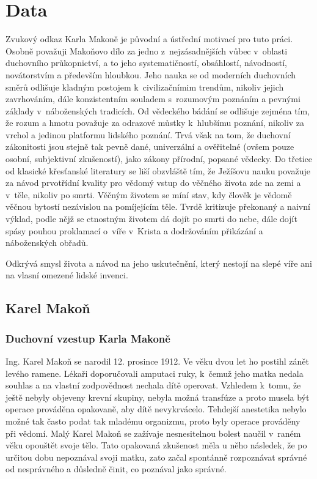 \chapter{Data}
\label{kap:data}

Zvukový odkaz Karla Makoně je původní a ústřední motivací pro tuto práci. Osobně
považuji Makoňovo dílo za jedno z~nejzásadnějších vůbec v~oblasti duchovního
průkopnictví, a to jeho systematičností, obsáhlostí, návodností, novátorstvím a
především hloubkou. Jeho nauka se od moderních duchovních směrů odlišuje kladným
postojem k~civilizačnímim trendům, nikoliv jejich zavrhováním, dále
konzistentním souladem s~rozumovým poznáním a pevnými základy v~náboženských
tradicích. Od vědeckého bádání se odlišuje zejména tím, že rozum a hmotu
považuje za odrazové můstky k~hlubšímu poznání, nikoliv za vrchol a jedinou
platformu lidského poznání. Trvá však na tom, že duchovní zákonitosti jsou
stejně tak pevně dané, univerzální a ověřitelné (ovšem pouze osobní, subjektivní
zkušeností), jako zákony přírodní, popsané vědecky. Do třetice od klasické
křesťanské literatury se liší obzvláště tím, že Ježíšovu nauku považuje za návod
prvotřídní kvality pro vědomý vstup do věčného života zde na zemi a v~těle,
nikoliv po smrti. Věčným životem se míní stav, kdy člověk je vědomě věčnou
bytostí nezávislou na pomíjejícím těle. Tvrdě kritizuje překonaný a naivní
výklad, podle nějž se ctnostným životem dá dojít po smrti do nebe, dále dojít
spásy pouhou proklamací o~víře v~Krista a dodržováním přikázání a náboženských
obřadů.

Odkrývá smysl života a návod na jeho uskutečnění, který nestojí na slepé víře
ani na vlasní omezené lidské invenci.

\section{Karel Makoň}

\subsection{Duchovní vzestup Karla Makoně}

Ing. Karel Makoň se narodil 12. prosince 1912. Ve věku dvou let ho postihl zánět
levého ramene. Lékaři doporučovali amputaci ruky, k~čemuž jeho matka nedala
souhlas a na vlastní zodpovědnost nechala dítě operovat. Vzhledem k~tomu, že
ještě nebyly objeveny krevní skupiny, nebyla možná transfúze a proto musela být
operace prováděna opakovaně, aby dítě nevykrvácelo. Tehdejší anestetika nebylo
možné tak často podat tak mladému organizmu, proto byly operace prováděny při
vědomí. Malý Karel Makoň se zažívaje nesnesitelnou bolest naučil v~raném věku
opouštět svoje tělo. Tato opakovaná zkušenost měla u něho následek, že po
určitou dobu nepoznával svoji matku, zato začal spontánně rozpoznávat správné od
nesprávného a důsledně činit, co poznával jako správné.

